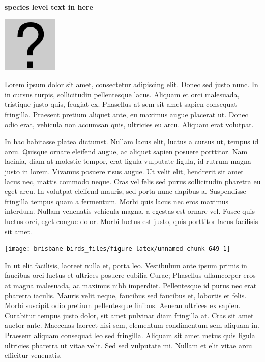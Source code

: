 \documentclass[]{book}
\let\origfigure\figure
\let\endorigfigure\endfigure
\renewenvironment{figure}[1][2] {
  \expandafter\origfigure\expandafter[H]
} {
  \endorigfigure
}
\begin{document}
\textbf{species level text in here}

\begin{figure}
\centering
\includegraphics{assets/missing.png}
\caption{No image for species}
\end{figure}

Lorem ipsum dolor sit amet, consectetur adipiscing elit. Donec sed justo
nunc. In in cursus turpis, sollicitudin pellentesque lacus. Aliquam et
orci malesuada, tristique justo quis, feugiat ex. Phasellus at sem sit
amet sapien consequat fringilla. Praesent pretium aliquet ante, eu
maximus augue placerat ut. Donec odio erat, vehicula non accumsan quis,
ultricies eu arcu. Aliquam erat volutpat.

In hac habitasse platea dictumst. Nullam lacus elit, luctus a cursus ut,
tempus id arcu. Quisque ornare eleifend augue, ac aliquet sapien posuere
porttitor. Nam lacinia, diam at molestie tempor, erat ligula vulputate
ligula, id rutrum magna justo in lorem. Vivamus posuere risus augue. Ut
velit elit, hendrerit sit amet lacus nec, mattis commodo neque. Cras vel
felis sed purus sollicitudin pharetra eu eget arcu. In volutpat eleifend
mauris, sed porta nunc dapibus a. Suspendisse fringilla tempus quam a
fermentum. Morbi quis lacus nec eros maximus interdum. Nullam venenatis
vehicula magna, a egestas est ornare vel. Fusce quis luctus orci, eget
congue dolor. Morbi luctus est justo, quis porttitor lacus facilisis sit
amet.

\begin{figure}
\texttt{[image: brisbane-birds\_files/figure-latex/unnamed-chunk-649-1]} \caption{insert figure caption}\label{fig:unnamed-chunk-649}
\end{figure}

In ut elit facilisis, laoreet nulla et, porta leo. Vestibulum ante ipsum
primis in faucibus orci luctus et ultrices posuere cubilia Curae;
Phasellus ullamcorper eros at magna malesuada, ac maximus nibh
imperdiet. Pellentesque id purus nec erat pharetra iaculis. Mauris velit
neque, faucibus sed faucibus et, lobortis et felis. Morbi suscipit odio
pretium pellentesque finibus. Aenean ultrices ex sapien. Curabitur
tempus justo dolor, sit amet pulvinar diam fringilla at. Cras sit amet
auctor ante. Maecenas laoreet nisi sem, elementum condimentum sem
aliquam in. Praesent aliquam consequat leo sed fringilla. Aliquam sit
amet metus quis ligula ultricies pharetra ut vitae velit. Sed sed
vulputate mi. Nullam et elit vitae arcu efficitur venenatis.
\end{document}

